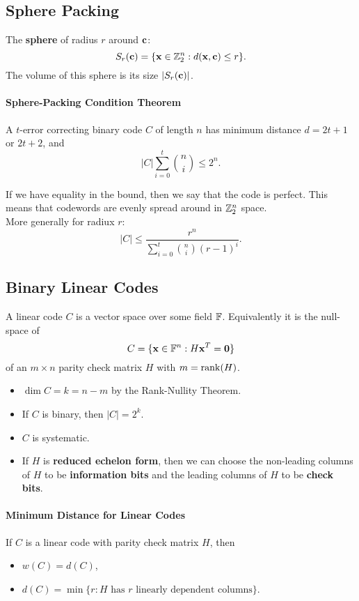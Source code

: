 
\subsection{Sphere Packing}
The \textbf{sphere} of radius \(r\) around \(\mathbf{c}\):
\[S_r(\mathbf{c}) = \{ \mathbf{x} \in \mathbb{Z}_2^n : d(\mathbf{x}, \mathbf{c}) \leq r \}.\]
The volume of this sphere is its size \(|S_r(\mathbf{c})|\).

\paragraph{Sphere-Packing Condition Theorem}
A \(t\)-error correcting binary code \(C\) of length \(n\) has minimum distance \(d = 2t + 1\) or \(2t + 2\), and
\[|C|\sum_{i=0}^t \binom{n}{i} \leq 2^n.\]

If we have equality in the bound, then we say that the code is perfect.  This means that codewords are evenly spread around in \(\mathbb{Z}_2^n\) space. \\

More generally for radiux \(r\):
\[|C| \leq \frac{r^n}{\sum_{i=0}^{t}\binom{n}{i}(r - 1)^i}.\]

\subsection{Binary Linear Codes}
A linear code \(C\) is a vector space over some field \(\mathbb{F}\). Equivalently it is the null-space of
\[C = \{\mathbf{x} \in \mathbb{F}^n : H\mathbf{x}^T = \mathbf{0} \}\]
of an \(m \times n\) parity check matrix \(H\) with \(m = \rank(H)\).
\begin{itemize}
    \item \(\dim C = k = n - m\) by the Rank-Nullity Theorem.
    \item If \(C\) is binary, then \(|C| = 2^k\).
    \item \(C\) is systematic.
    \item If \(H\) is \textbf{reduced echelon form}, then we can choose the non-leading columns of \(H\) to be \textbf{information bits} and the leading columns of \(H\) to be \textbf{check bits}.
\end{itemize}

\paragraph{Minimum Distance for Linear Codes}
If \(C\) is a linear code with parity check matrix \(H\), then
\begin{itemize}
    \item\(w(C) = d(C)\),
    \item \(d(C) = \min\{ r: H \text{ has } r \text{ linearly dependent columns} \}\).
\end{itemize}


